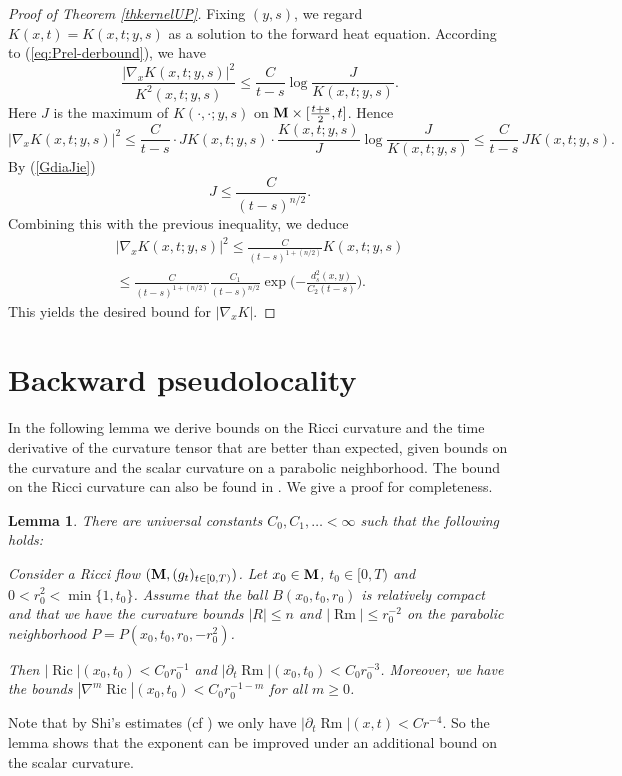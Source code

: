 \documentclass[11pt]{amsart}
\numberwithin{equation}{section}
\newtheorem{lemma}[theorem]{Lemma}
\def\M{{\bf M}}
\def\d{\nabla}
\DeclareMathOperator{\Ric}{Ric}
\DeclareMathOperator{\Rm}{Rm}
\numberwithin{equation}{section}
\begin{document}
\begin{proof}[Proof of Theorem \ref{thkernelUP}]
Fixing $(y, s)$, we regard $K(x,t) =K(x, t; y, s)$ as a solution to the forward heat equation.
According to (\ref{eq:Prel-derbound}), we have
\[
\frac{| \d_x K(x, t; y, s) |^2}{K^2(x, t; y, s)}
\le \frac{C}{t-s} \log \frac{J}{K(x, t; y, s)}.
\] 
Here $J$ is the maximum of $K(\cdot, \cdot ; y, s)$ on $\M \times [\frac{t+s}{2}, t]$.
Hence
\[
| \d_x K(x, t; y, s) |^2 \le  \frac{C}{t-s} \cdot  J K(x,t;y,s) \cdot \frac{K(x,t;y,s)}{J} \log \frac{J}{K(x,t;y,s)}
\le \frac{C}{t-s} \, J K(x,t; y,s).
\] 
By (\ref{GdiaJie})
\[
J \le \frac{C}{(t-s)^{n/2}}.
\]  
Combining this with the previous inequality, we deduce
\begin{multline*}
| \d_x K(x, t; y, s) |^2 \le  \frac{C}{(t-s)^{1+(n/2)}} K(x,t; y,s) \\
\leq \frac{C}{(t-s)^{1+(n/2)}} \frac{C_1}{(t-s)^{n/2}} \exp \Big( {- \frac{d^2_s (x, y)}{C_2 (t-s)}} \Big).
\end{multline*}
This yields the desired bound for $|\d_x K|$.
\end{proof}



\section{Backward pseudolocality} \label{sec:pseudoloc}
In the following lemma we derive bounds on the Ricci curvature and the time derivative of the curvature tensor that are better than expected, given bounds on the curvature and the scalar curvature on a parabolic neighborhood.
The bound on the Ricci curvature can also be found in \cite[Theorem 3.2]{Wa:1}.
We give a proof for completeness. 

\begin{lemma} \label{Lem:goodRicbound}
There are universal constants $C_0, C_1, \ldots < \infty$ such that the following holds:

Consider a Ricci flow $(\M, (g_t)_{t \in [0,T)})$.
Let $x_0 \in \M$, $t_0 \in [0,T)$ and $0 < r_0^2 <\min \{ 1, t_0 \}$.
Assume that the ball $B(x_0, t_0, r_0)$ is relatively compact and that we have the curvature bounds $|R| \leq n$ and $|{\Rm}| \leq r_0^{-2}$ on the parabolic neighborhood $P = P(x_0,t_0,r_0,-r_0^2)$.

Then $|{\Ric}| (x_0,t_0) < C_0 r_0^{-1}$ and $|\partial_t {\Rm}| (x_0,t_0) < C_0 r_0^{-3}$.
Moreover, we have the bounds $|\nabla^m {\Ric}| (x_0, t_0) < C_0 r_0^{-1-m}$ for all $m \geq 0$.
\end{lemma}

Note that by Shi's estimates (cf \cite{Sh:1}) we only have $|\partial_t {\Rm}| (x,t) < C r^{-4}$.
So the lemma shows that the exponent can be improved under an additional bound on the scalar curvature.
\end{document}
